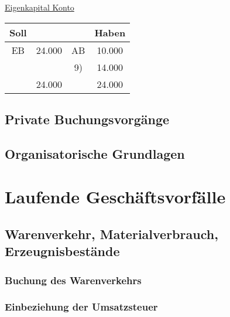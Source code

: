 \documentclass[paper=a4, fontsize=11pt]{scrartcl}
\numberwithin{equation}{section}
\numberwithin{figure}{section}
\numberwithin{table}{section}
\begin{document}
\underline{Eigenkapital Konto}
\begin{tabular}{cc|cc}
Soll & & & Haben \\
\hline
EB & 24.000 & AB & 10.000 \\
& & 9) & 14.000 \\
\hline
&24.000 && 24.000 \\
\end{tabular}


\subsection{Private Buchungsvorgänge}


\subsection{Organisatorische Grundlagen}


\newpage

\section{Laufende Geschäftsvorfälle}


\subsection{Warenverkehr, Materialverbrauch, Erzeugnisbestände}


\subsubsection{Buchung des Warenverkehrs}


\subsubsection{Einbeziehung der Umsatzsteuer}
\end{document}
